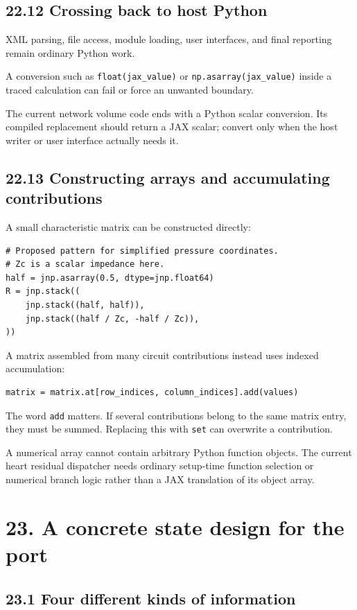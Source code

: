 \documentclass[11pt,a4paper]{article}
\begin{document}
\subsection{22.12 Crossing back to host Python}
XML parsing, file access, module loading, user interfaces, and final reporting remain ordinary Python work.

A conversion such as \texttt{float(jax\_\allowbreak{}value)} or \texttt{np.\allowbreak{}asarray(jax\_\allowbreak{}value)} inside a traced calculation can fail or force an unwanted boundary.

The current network volume code ends with a Python scalar conversion. Its compiled replacement should return a JAX scalar; convert only when the host writer or user interface actually needs it.

\subsection{22.13 Constructing arrays and accumulating contributions}
A small characteristic matrix can be constructed directly:


\begin{lstlisting}
# Proposed pattern for simplified pressure coordinates.
# Zc is a scalar impedance here.
half = jnp.asarray(0.5, dtype=jnp.float64)
R = jnp.stack((
    jnp.stack((half, half)),
    jnp.stack((half / Zc, -half / Zc)),
))
\end{lstlisting}
A matrix assembled from many circuit contributions instead uses indexed accumulation:


\begin{lstlisting}
matrix = matrix.at[row_indices, column_indices].add(values)
\end{lstlisting}
The word \texttt{add} matters. If several contributions belong to the same matrix entry, they must be summed. Replacing this with \texttt{set} can overwrite a contribution.

A numerical array cannot contain arbitrary Python function objects. The current heart residual dispatcher needs ordinary setup-time function selection or numerical branch logic rather than a JAX translation of its object array.

\clearpage
\section{23. A concrete state design for the port}
\subsection{23.1 Four different kinds of information}
\end{document}
